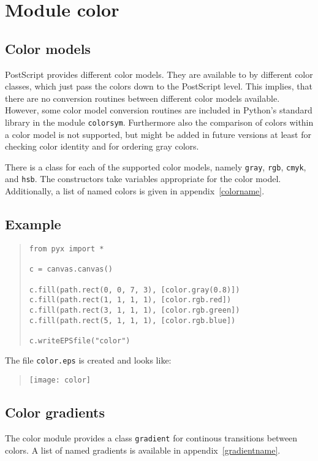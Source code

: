 \chapter{Module color}
\label{color}
\section{Color models}
PostScript provides different color models. They are available to
\PyX{} by different color classes, which just pass the colors down to
the PostScript level. This implies, that there are no conversion
routines between different color models available. However, some color
model conversion routines are included in Python's standard library in
the module \texttt{colorsym}. Furthermore also the comparison of
colors within a color model is not supported, but might be added in
future versions at least for checking color identity and for ordering
gray colors.

There is a class for each of the supported color models, namely
\verb|gray|, \verb|rgb|, \verb|cmyk|, and \verb|hsb|. The constructors
take variables appropriate for the color model. Additionally, a list of
named colors is given in appendix~\ref{colorname}.

\section{Example}
\begin{quote}
\begin{verbatim}
from pyx import *

c = canvas.canvas()

c.fill(path.rect(0, 0, 7, 3), [color.gray(0.8)])
c.fill(path.rect(1, 1, 1, 1), [color.rgb.red])
c.fill(path.rect(3, 1, 1, 1), [color.rgb.green])
c.fill(path.rect(5, 1, 1, 1), [color.rgb.blue])

c.writeEPSfile("color")
\end{verbatim}
\end{quote}

The file \verb|color.eps| is created and looks like:
\begin{quote}
\texttt{[image: color]}
\end{quote}

\section{Color gradients}

The color module provides a class \verb|gradient| for continous transitions between
colors. A list of named gradients is available in appendix~\ref{gradientname}.

